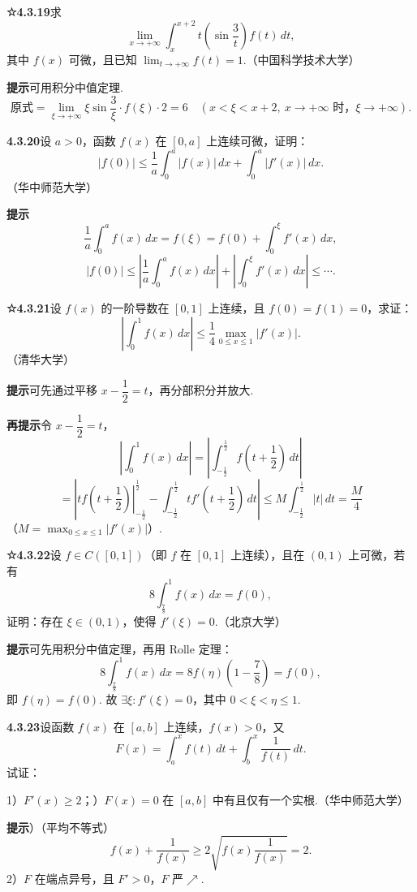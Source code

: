 \documentclass[UTF8,12pt,a4paper,fontset=fandol]{ctexart}
\begin{document}
\noindent\textbf{☆4.3.19}\quad 求
\[
\lim_{x\to+\infty}\int_x^{x+2}t\left(\sin\frac3t\right)f(t)\,dt,
\]
其中 $f(x)$ 可微，且已知 $\displaystyle\lim_{t\to+\infty}f(t)=1$.（中国科学技术大学）

\noindent\textbf{提示}\quad 可用积分中值定理.
\[
\text{原式}=\lim_{\xi\to+\infty}\xi\sin\frac3\xi\cdot f(\xi)\cdot2=6
\quad(x<\xi<x+2,\ x\to+\infty\text{ 时，}\xi\to+\infty).
\]

\noindent\textbf{4.3.20}\quad 设 $a>0$，函数 $f(x)$ 在 $[0,a]$ 上连续可微，证明：
\[
|f(0)|\le\frac1a\int_0^a|f(x)|\,dx+\int_0^a|f'(x)|\,dx.
\]
（华中师范大学）

\noindent\textbf{提示}\quad
\[
\frac1a\int_0^a f(x)\,dx=f(\xi)=f(0)+\int_0^\xi f'(x)\,dx,
\]
\[
|f(0)|\le\left|\frac1a\int_0^a f(x)\,dx\right|
+\left|\int_0^\xi f'(x)\,dx\right|\le\cdots.
\]

\noindent\textbf{☆4.3.21}\quad 设 $f(x)$ 的一阶导数在 $[0,1]$ 上连续，且 $f(0)=f(1)=0$，求证：
\[
\left|\int_0^1 f(x)\,dx\right|
\le\frac14\max_{0\le x\le1}|f'(x)|.
\]
（清华大学）

\noindent\textbf{提示}\quad 可先通过平移 $x-\dfrac12=t$，再分部积分并放大.

\noindent\textbf{再提示}\quad 令 $x-\dfrac12=t$，
\[
\left|\int_0^1f(x)\,dx\right|
=\left|\int_{-\frac12}^{\frac12}f\left(t+\frac12\right)\,dt\right|
\]
\[
=\left|\left.tf\left(t+\frac12\right)\right|_{-\frac12}^{\frac12}
-\int_{-\frac12}^{\frac12}tf'\left(t+\frac12\right)\,dt\right|
\le M\int_{-\frac12}^{\frac12}|t|\,dt=\frac M4
\]
（$M=\displaystyle\max_{0\le x\le1}|f'(x)|$）.

\noindent\textbf{☆4.3.22}\quad 设 $f\in C([0,1])$（即 $f$ 在 $[0,1]$ 上连续），且在 $(0,1)$ 上可微，若有
\[
8\int_{\frac78}^1f(x)\,dx=f(0),
\]
证明：存在 $\xi\in(0,1)$，使得 $f'(\xi)=0$.（北京大学）

\noindent\textbf{提示}\quad 可先用积分中值定理，再用 Rolle 定理：
\[
8\int_{\frac78}^1f(x)\,dx=8f(\eta)\left(1-\frac78\right)=f(0),
\]
即 $f(\eta)=f(0)$. 故 $\exists\xi:f'(\xi)=0$，其中 $0<\xi<\eta\le1$.

\noindent\textbf{4.3.23}\quad 设函数 $f(x)$ 在 $[a,b]$ 上连续，$f(x)>0$，又
\[
F(x)=\int_a^x f(t)\,dt+\int_b^x\frac1{f(t)}\,dt.
\]
试证：

1）$F'(x)\ge2$；）$F(x)=0$ 在 $[a,b]$ 中有且仅有一个实根.（华中师范大学）

\noindent\textbf{提示}）（平均不等式）
\[
f(x)+\frac1{f(x)}\ge2\sqrt{f(x)\frac1{f(x)}}=2.
\]
2）$F$ 在端点异号，且 $F'>0$，$F$ 严$\nearrow$.
\end{document}

